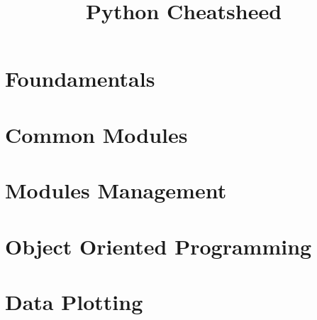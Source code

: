 \documentclass[10pt,landscape,a4paper]{article}
\title{Python Cheatsheed}
\author{}
\date{}
\begin{document}
    \maketitle
    \footnotesize           %

    \begin{multicols}{3}
        \tableofcontents
    \end{multicols}
    \newpage



    \section{Foundamentals}
        \begin{multicols}{3}
            
        \end{multicols}
    \newpage


    \section{Common Modules}
        \begin{multicols}{3}
            
        \end{multicols}
    \newpage


    \section{Modules Management}
        \begin{multicols}{3}
            
        \end{multicols} 
    \newpage


    \section{Object Oriented Programming}
        \begin{multicols}{3}
            
        \end{multicols}
    \newpage


    \section{Data Plotting}
        \begin{multicols}{3}
            
        \end{multicols}
    \newpage
\end{document}
